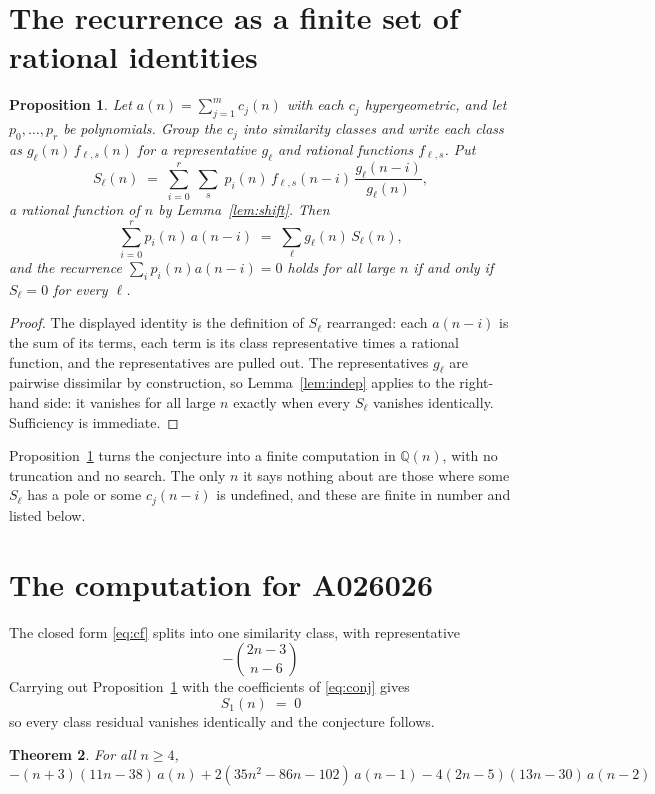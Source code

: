 \documentclass[11pt,a4paper]{article}
\theoremstyle{plain}
\newtheorem{theorem}{Theorem}
\newtheorem{proposition}[theorem]{Proposition}
\theoremstyle{definition}
\begin{document}
\section{The recurrence as a finite set of rational identities}

\begin{proposition}\label{prop:main}
Let $a(n)=\sum_{j=1}^{m}c_{j}(n)$ with each $c_{j}$ hypergeometric, and let
$p_{0},\dots,p_{r}$ be polynomials. Group the $c_{j}$ into similarity classes and write
each class as $g_{\ell}(n)\,f_{\ell,s}(n)$ for a representative $g_{\ell}$ and rational
functions $f_{\ell,s}$. Put
\[
S_{\ell}(n)\;=\;\sum_{i=0}^{r}\;\sum_{s}\;p_{i}(n)\,f_{\ell,s}(n-i)\,
\frac{g_{\ell}(n-i)}{g_{\ell}(n)} ,
\]
a rational function of $n$ by Lemma~\ref{lem:shift}. Then
\[
\sum_{i=0}^{r}p_{i}(n)\,a(n-i)\;=\;\sum_{\ell}g_{\ell}(n)\,S_{\ell}(n),
\]
and the recurrence $\sum_{i}p_{i}(n)a(n-i)=0$ holds for all large $n$ if and only if
$S_{\ell}=0$ for every $\ell$.
\end{proposition}

\begin{proof}
The displayed identity is the definition of $S_{\ell}$ rearranged: each $a(n-i)$ is the
sum of its terms, each term is its class representative times a rational function, and the
representatives are pulled out. The representatives $g_{\ell}$ are pairwise dissimilar by
construction, so Lemma~\ref{lem:indep} applies to the right-hand side: it vanishes for all
large $n$ exactly when every $S_{\ell}$ vanishes identically. Sufficiency is immediate.
\end{proof}

Proposition~\ref{prop:main} turns the conjecture into a finite computation in
$\mathbb{Q}(n)$, with no truncation and no search. The only $n$ it says nothing about are
those where some $S_{\ell}$ has a pole or some $c_{j}(n-i)$ is undefined, and these are
finite in number and listed below.

\section{The computation for A026026}

The closed form \eqref{eq:cf} splits into one similarity class, with
representative
\[
- {\binom{2 n - 3}{n - 6}}
\]
Carrying out Proposition~\ref{prop:main} with the coefficients of \eqref{eq:conj} gives
\[
S_{1}(n)\;=\;0
\]
so every class residual vanishes identically and the conjecture follows.

\begin{theorem}
For all $n\ge 4$,
\[
- \left(n + 3\right) \left(11 n - 38\right)\,a(n) + 2 \left(35 n^{2} - 86 n - 102\right)\,a(n-1) -  4 \left(2 n - 5\right) \left(13 n - 30\right)\,a(n-2)
\]
\end{theorem}
\end{document}
